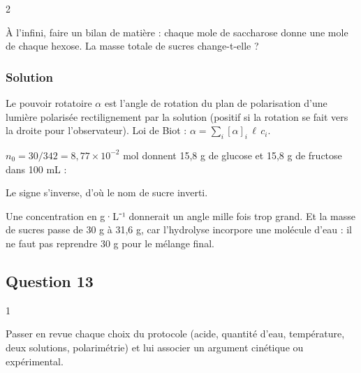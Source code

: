 \documentclass[11pt,a4paper]{article}
\newcommand{\equationajustee}[1]{%
  \sbox{\boiteequation}{$\displaystyle #1$}%
  \ifdim\wd\boiteequation>\linewidth
    \[\resizebox{\linewidth}{!}{\usebox{\boiteequation}}\]%
  \else
    \[#1\]%
  \fi}
\begin{document}
\begin{indication}{2}

À l'infini, faire un bilan de matière : chaque mole de saccharose donne une mole de chaque hexose. La masse totale de sucres change-t-elle ?

\end{indication}

\hypertarget{solution-11}{%
\subsubsection{Solution}\label{solution-11}}

Le pouvoir rotatoire \(\alpha\) est l'angle de rotation du plan de polarisation d'une lumière polarisée rectilignement par la solution (positif si la rotation se fait vers la droite pour l'observateur). Loi de Biot : \(\alpha=\sum_i[\alpha]_i\,\ell\,c_i\).

\equationajustee{\alpha_0=66\times0{,}615\times0{,}300}

\equationajustee{\boxed{\alpha_0=+12{,}2^\circ}}

\(n_0=30/342=8{,}77\times10^{-2}\) mol donnent 15,8 g de glucose et 15,8 g de fructose dans 100 mL :

\equationajustee{\alpha_\infty=0{,}615\times0{,}158\times(52-92)}

\equationajustee{\boxed{\alpha_\infty=-3{,}9^\circ}}

Le signe s'inverse, d'où le nom de sucre inverti.

\begin{piege}

Une concentration en g·L⁻¹ donnerait un angle mille fois trop grand. Et la masse de sucres passe de 30 g à 31,6 g, car l'hydrolyse incorpore une molécule d'eau : il ne faut pas reprendre 30 g pour le mélange final.

\end{piege}

\hypertarget{question-13}{%
\subsection{Question 13}\label{question-13}}

\begin{indication}{1}

Passer en revue chaque choix du protocole (acide, quantité d'eau, température, deux solutions, polarimétrie) et lui associer un argument cinétique ou expérimental.

\end{indication}
\end{document}
